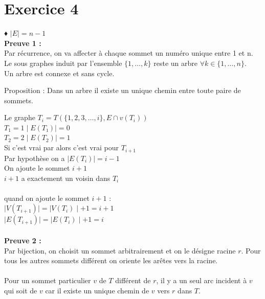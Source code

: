 \documentclass{article}
\begin{document}
\section*{Exercice 4}♦
$\mid E \mid = n-1$ \\
\textbf{Preuve 1 :}  \\
Par récurrence, on va affecter à chaque sommet un numéro unique entre 1 et n. 
Le sous graphes induit par l’ensemble $\{1,…,k\}$ reste un arbre $\forall k \in \{1,…,n\}$. \\
Un arbre est connexe et sans cycle. \\
\begin{center}
Proposition : Dans un arbre il existe un unique chemin entre toute paire de sommets. 
\end{center}
Le graphe $T_i=T(\{1,2,3,…,i\}, E \cap v(T_i))$ \\
$T_1=1 \mid E(T₁) \mid=0$ \\
$T_2=2 \mid E(T_2)\mid=1$ \\
Si c’est vrai par  alors c’est vrai pour $T_{i+1}$ \\
Par hypothèse on a $\mid E(T_i) \mid=i-1$ \\
On ajoute le sommet $i+1$ \\
$i+1$ a exactement un voisin dans $T_{i}$ \\
\\
quand on ajoute le sommet $i+1$ : \\
$\mid V(T_{i+1}) \mid =\mid V(T_i) \mid +1=i+1$\\
$\mid E(T_{i+1}) \mid = \mid E(T_i) \mid +1=i$\\
\\
\textbf{Preuve 2 :} \\
Par bijection, on choisit un sommet arbitrairement et on le désigne racine $r$.
Pour tous les autres sommets différent on oriente les arêtes vers la racine.\\
\\
Pour un sommet particulier $v$ de $T$ différent de $r$, il y a un seul arc incident à $v$ qui soit de $v$ car il existe un unique chemin de $v$ vers $r$ dans $T$. \\
\\
\end{document}

